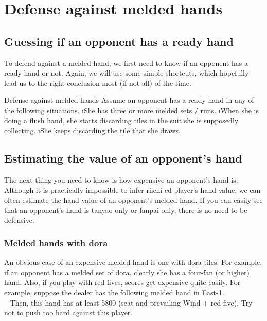 {{\vfill

\section{Defense against melded hands} \label{sec:defense_meld}

\subsection{Guessing if an opponent has a ready hand}
To defend against a melded hand, we first need to know if an opponent has a ready hand or not. Again, we will use some simple shortcuts, which hopefully lead us to the right conclusion most (if not all) of the time. 

\bigskip
\begin{itembox}[c]{Defense against melded hands}
Assume an opponent has a ready hand in any of the following situations.
\be
\i She has three or more melded sets / runs.
\i When she is doing a flush hand, she starts discarding tiles in the suit she is supposedly collecting.
\i She keeps discarding the tile that she draws.
\ee
\vsps
\end{itembox}
\bigskip

\subsection{Estimating the value of an opponent's hand}

The next thing you need to know is how expensive an opponent's hand is. Although it is practically impossible to infer {\jap riichi}-ed player's hand value, we can often estimate the hand value of an opponent's melded hand. If you can easily see that an opponent's hand is {\jap tanyao}-only or {\jap fanpai}-only, there is no need to be defensive.

\subsubsection*{Melded hands with {\jap dora}}

An obvious case of an expensive melded hand is one with {\jap dora} tiles. 
For example, if an opponent has a melded set of {\jap dora}, clearly she has a four-fan (or higher) hand. Also, if you play with red fives, scores get expensive quite easily. For example, suppose the dealer has the following melded hand in East-1.
\vspace{-20pt}
\bp
{}\\ \vspace{-18pt}
\rdong\dong\dong~\rfs{}
\ep
Then, this hand has at least 5800 (seat and prevailing Wind + red five). Try not to push too hard against this player. 

}}

